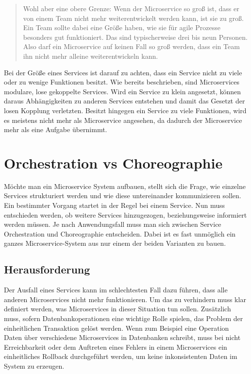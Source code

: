 \begin{quotation}
    \frqq Wohl aber eine obere Grenze: Wenn der Microservice so groß ist, dass er von einem Team nicht mehr weiterentwickelt werden kann, ist sie zu groß. Ein Team sollte dabei eine Größe haben, wie sie für agile Prozesse besonders gut funktioniert. Das sind typischerweise drei bis neun Personen. Also darf ein Microservice auf keinen Fall so groß werden, dass ein Team ihn nicht mehr alleine weiterentwickeln kann.\flqq\ \cite[S. 33f]{EWolff2016:Microservices}
\end{quotation}

Bei der Größe eines Services ist darauf zu achten, dass ein Service nicht zu viele oder zu wenige Funktionen besitzt. Wie bereits beschrieben, sind Microservices modulare, lose gekoppelte Services. Wird ein Service zu klein angesetzt, können daraus Abhängigkeiten zu anderen Services entstehen und damit das Gesetzt der losen Kopplung verletzten. Besitzt hingegen ein Service zu viele Funktionen, wird es meistens nicht mehr als Microservice angesehen, da dadurch der Microservice mehr als eine Aufgabe übernimmt.

\section{Orchestration vs Choreographie}
\label{sec:orchestrationvschoreographie}
Möchte man ein Microservice System aufbauen, stellt sich die Frage, wie einzelne Services strukturiert werden und wie diese untereinander kommunizieren sollen. Ein bestimmter Vorgang startet in der Regel bei einem Service. Nun muss entschieden werden, ob weitere Services hinzugezogen, beziehungsweise informiert werden müssen.
Je nach Anwendungsfall muss man sich zwischen Service Orchestration und Choreographie entscheiden. Dabei ist es fast unmöglich ein ganzes Microservice-System aus nur einem der beiden Varianten zu bauen.

\subsection{Herausforderung}
\label{sec:Herausforderung}
Der Ausfall eines Services kann im schlechtesten Fall dazu führen, dass alle anderen Microservices nicht mehr funktionieren. Um das zu verhindern muss klar definiert werden, was Microservices in dieser Situation tun sollen. Zusätzlich muss, sofern Datenbankoperationen eine wichtige Rolle spielen, das Problem der einheitlichen Transaktion gelöst werden. Wenn zum Beispiel eine Operation Daten über verschiedene Microservices in Datenbanken schreibt, muss bei nicht Erreichbarkeit oder dem Auftreten eines Fehlers in einem Microservices ein einheitliches Rollback durchgeführt werden, um keine inkonsistenten Daten im System zu erzeugen.

